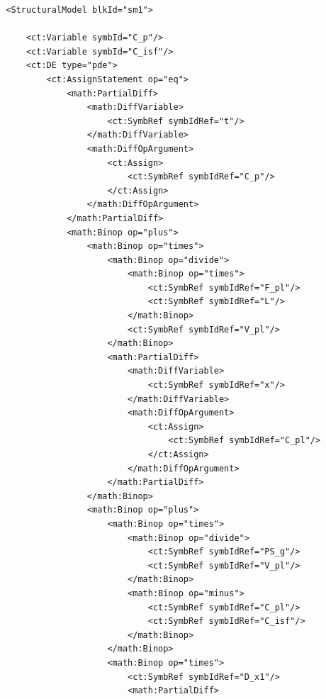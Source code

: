 \lstset{language=XML}
\begin{lstlisting}
        <StructuralModel blkId="sm1">
            
            <ct:Variable symbId="C_p"/>
            <ct:Variable symbId="C_isf"/>
            <ct:DE type="pde">
                <ct:AssignStatement op="eq">
                    <math:PartialDiff>
                        <math:DiffVariable>
                            <ct:SymbRef symbIdRef="t"/>
                        </math:DiffVariable>
                        <math:DiffOpArgument>
                            <ct:Assign>
                                <ct:SymbRef symbIdRef="C_p"/>
                            </ct:Assign>
                        </math:DiffOpArgument>
                    </math:PartialDiff>
                    <math:Binop op="plus">
                        <math:Binop op="times">
                            <math:Binop op="divide">
                                <math:Binop op="times">
                                    <ct:SymbRef symbIdRef="F_pl"/>
                                    <ct:SymbRef symbIdRef="L"/>
                                </math:Binop>
                                <ct:SymbRef symbIdRef="V_pl"/>
                            </math:Binop>
                            <math:PartialDiff>
                                <math:DiffVariable>
                                    <ct:SymbRef symbIdRef="x"/>
                                </math:DiffVariable>
                                <math:DiffOpArgument>
                                    <ct:Assign>
                                        <ct:SymbRef symbIdRef="C_pl"/>
                                    </ct:Assign>
                                </math:DiffOpArgument>
                            </math:PartialDiff>
                        </math:Binop>
                        <math:Binop op="plus">
                            <math:Binop op="times">
                                <math:Binop op="divide">
                                    <ct:SymbRef symbIdRef="PS_g"/>
                                    <ct:SymbRef symbIdRef="V_pl"/>
                                </math:Binop>
                                <math:Binop op="minus">
                                    <ct:SymbRef symbIdRef="C_pl"/>
                                    <ct:SymbRef symbIdRef="C_isf"/>
                                </math:Binop>
                            </math:Binop>
                            <math:Binop op="times">
                                <ct:SymbRef symbIdRef="D_x1"/>
                                <math:PartialDiff>

\end{lstlisting}
